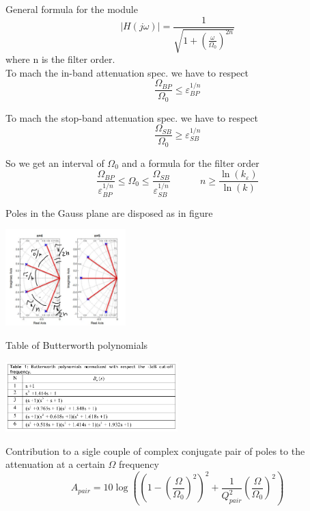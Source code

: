 General formula for the module 
\begin{equation}
|H(j\omega)|=\frac{1}{\sqrt{1+(\frac{\omega}{\Omega_0})^{2n}}}
\end{equation}
where n is the filter order.\\

To mach the in-band attenuation spec. we have to respect
\begin{equation}
\frac{\Omega_{BP}}{\Omega_0}\le \varepsilon_{BP}^{1/n}
\end{equation}

To mach the stop-band attenuation spec. we have to respect
\begin{equation}
\frac{\Omega_{SB}}{\Omega_0}\ge \varepsilon_{SB}^{1/n}
\end{equation}

So we get an interval of $\Omega_0$ and a formula for the filter order
\begin{equation}
\frac{\Omega_{BP}}{\varepsilon_{BP}^{1/n}} \le \Omega_0 \le \frac{\Omega_{SB}}{\varepsilon_{SB}^{1/n}} \ \ \ \ \ \ \ \ \ \ \ \ \ \ n \ge \frac{\ln(k_{\varepsilon})}{\ln(k)}
\end{equation}

Poles in the Gauss plane are disposed as in figure


\centering
\includegraphics[width=0.35\textwidth]{Gaussbutt.png}\\
\raggedright

Table of Butterworth polynomials

\centering
\includegraphics[width=0.5\textwidth]{butt.png}\\
\raggedright

Contribution to a sigle couple of complex conjugate pair of poles to the attenuation at a certain $\Omega$ frequency
\begin{equation}
A_{pair}=10 \log\left(\left(1-(\frac{\Omega}{\Omega_0})^2\right)^2+\frac{1}{Q_{pair}^2}(\frac{\Omega}{\Omega_0})^2\right)
\end{equation}


